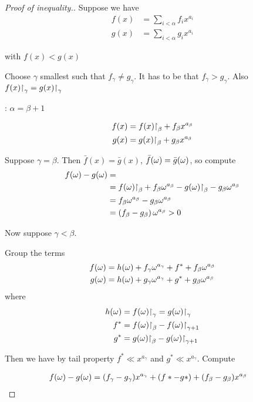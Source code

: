 \begin{proof}[Proof of inequality.] %
	Suppose we have
	\begin{align*}
		f(x) &= \sum_{i < \alpha} f_i x^{a_i} \\
		g(x) &= \sum_{i < \alpha} g_i x^{a_i}
	\end{align*}

	with $f(x) < g(x)$

	Choose $\gamma$ smallest such that $f_\gamma \neq g_\gamma$.
	It has to be that $f_\gamma > g_\gamma$. Also $f(x)\mathord{\upharpoonright}_{\gamma} = g(x)\mathord{\upharpoonright}_{\gamma}$

	: $\alpha = \beta + 1$

	\begin{align*}
		f(x) &= f(x)\mathord{\upharpoonright}_{\beta} + f_\beta x^{a_\beta}\\
		g(x) &= g(x)\mathord{\upharpoonright}_{\beta} + g_\beta x^{a_\beta}
	\end{align*}

	Suppose $\gamma = \beta$.
	Then $\bar f(x) = \bar g(x)$, $\bar f(\omega) = \bar g(\omega)$, so compute
	\begin{align*}
		f(\omega) - g(\omega) &= \\
		&= f(\omega)\mathord{\upharpoonright}_{\beta} + f_\beta \omega^{a_\beta} - g(\omega)\mathord{\upharpoonright}_{\beta} - g_\beta \omega^{a_\beta} \\
		&= f_\beta \omega^{a_\beta} - g_\beta \omega^{a_\beta} \\
		&= \left( f_\beta - g_\beta \right) \omega^{a_\beta} > 0
	\end{align*}

	Now suppose $\gamma < \beta$.

	Group the terms
	\begin{align*}
		f(\omega) &= h(\omega) + f_\gamma \omega^{a_\gamma} + f^* + f_\beta \omega^{a_\beta} \\
		g(\omega) &= h(\omega) + g_\gamma \omega^{a_\gamma} + g^* + g_\beta \omega^{a_\beta}
	\end{align*}
	where
	\begin{align*}
		h(\omega) &= f(\omega)\mathord{\upharpoonright}_{\gamma} = g(\omega)\mathord{\upharpoonright}_{\gamma} \\
		f^* &= f(\omega)\mathord{\upharpoonright}_{\beta} - f(\omega)\mathord{\upharpoonright}_{\gamma + 1} \\
		g^* &= g(\omega)\mathord{\upharpoonright}_{\beta} - g(\omega)\mathord{\upharpoonright}_{\gamma + 1}
	\end{align*}

	Then we have by tail property $f^* \ll x^{a_\gamma}$ and $g^* \ll x^{a_\gamma}$. Compute

	\begin{align*}
		f(\omega) - g(\omega) &= (f_\gamma - g_\gamma) x^{a_\gamma} + (f* - g*) + (f_\beta - g_\beta) x^{a_\beta}
	\end{align*}


\end{proof}
